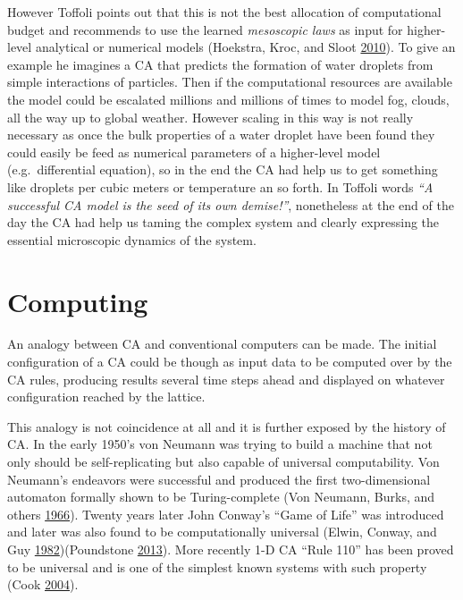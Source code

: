 \documentclass[
]{book}
\begin{document}
However Toffoli points out that this is not the best allocation of computational budget and recommends to use the learned \emph{mesoscopic laws} as input for higher-level analytical or numerical models (Hoekstra, Kroc, and Sloot \protect\hyperlink{ref-hoekstra2010simulating}{2010}). To give an example he imagines a CA that predicts the formation of water droplets from simple interactions of particles. Then if the computational resources are available the model could be escalated millions and millions of times to model fog, clouds, all the way up to global weather. However scaling in this way is not really necessary as once the bulk properties of a water droplet have been found they could easily be feed as numerical parameters of a higher-level model (e.g.~differential equation), so in the end the CA had help us to get something like droplets per cubic meters or temperature an so forth. In Toffoli words \emph{``A successful CA model is the seed of its own demise!''}, nonetheless at the end of the day the CA had help us taming the complex system and clearly expressing the essential microscopic dynamics of the system.

\hypertarget{computing}{%
\section{Computing}\label{computing}}

An analogy between CA and conventional computers can be made. The initial configuration of a CA could be though as input data to be computed over by the CA rules, producing results several time steps ahead and displayed on whatever configuration reached by the lattice.

This analogy is not coincidence at all and it is further exposed by the history of CA. In the early 1950's von Neumann was trying to build a machine that not only should be self-replicating but also capable of universal computability. Von Neumann's endeavors were successful and produced the first two-dimensional automaton formally shown to be Turing-complete (Von Neumann, Burks, and others \protect\hyperlink{ref-von1966theory}{1966}). Twenty years later John Conway's ``Game of Life'' was introduced and later was also found to be computationally universal (Elwin, Conway, and Guy \protect\hyperlink{ref-elwin1982winning}{1982})(Poundstone \protect\hyperlink{ref-poundstone2013recursive}{2013}). More recently 1-D CA ``Rule 110'' has been proved to be universal and is one of the simplest known systems with such property (Cook \protect\hyperlink{ref-cook2004universality}{2004}).
\end{document}

